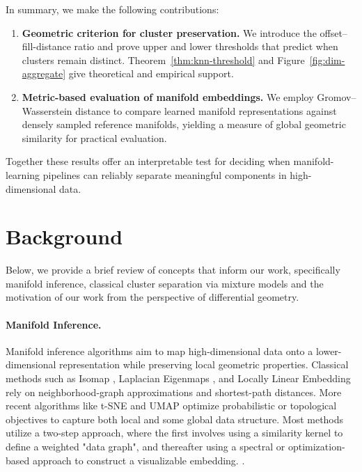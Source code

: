 \documentclass{article}
\theoremstyle{plain}
\theoremstyle{definition}
\theoremstyle{remark}
\begin{document}
In summary, we make the following contributions:
\begin{enumerate}
    \item \textbf{Geometric criterion for cluster preservation.} We introduce the offset–fill-distance ratio and prove upper and lower thresholds that predict when clusters remain distinct. Theorem~\ref{thm:knn-threshold} and Figure~\ref{fig:dim-aggregate} give theoretical and empirical support.
    \item \textbf{Metric-based evaluation of manifold embeddings.} We employ Gromov--Wasserstein distance to compare learned manifold representations against densely sampled reference manifolds, yielding a measure of global geometric similarity for practical evaluation.
\end{enumerate}

Together these results offer an interpretable test for deciding when manifold-learning pipelines can reliably separate meaningful components in high-dimensional data. 


\section{Background}
\label{sec:related-work}
Below, we provide a brief review of concepts that inform our work, specifically manifold inference, classical cluster separation via mixture models and the motivation of our work from the perspective of differential geometry.

\paragraph{Manifold Inference.}
Manifold inference algorithms aim to map high-dimensional data onto a lower-dimensional representation while preserving local geometric properties. Classical methods such as Isomap \cite{tenenbaumGlobalGeometricFramework2000}, Laplacian Eigenmaps \cite{belkinLaplacianEigenmapsDimensionality2003}, and Locally Linear Embedding \cite{roweisNonlinearDimensionalityReduction2000} rely on neighborhood-graph approximations and shortest-path distances. More recent algorithms like t-SNE \cite{maaten2008tsne} and UMAP \cite{mcinnesUMAPUniformManifold2020} optimize probabilistic or topological objectives to capture both local and some global data structure. Most methods utilize a two-step approach, where the first involves using a similarity kernel to define a weighted "data graph", and thereafter using a spectral or optimization-based approach to construct a visualizable embedding.  \cite{meilaManifoldLearningWhat2023}. 
\end{document}
